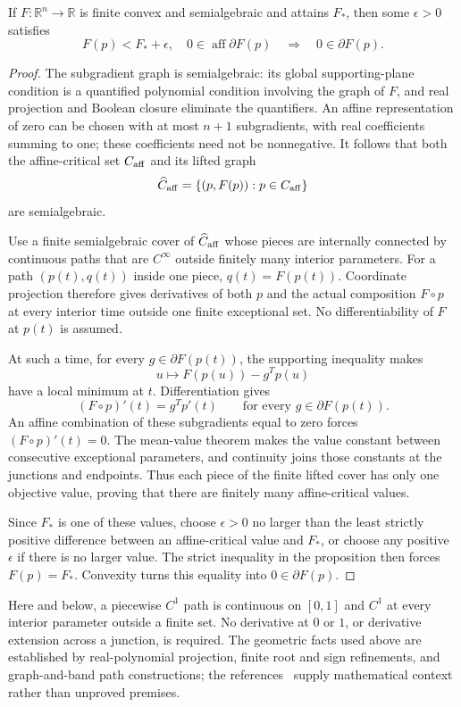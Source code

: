 \begin{proposition}\label{A:semialgebraic}
If $F:\mathbb R^n\to\mathbb R$ is finite convex and semialgebraic and attains $F_*$, then some $\epsilon>0$ satisfies
\[
 F(p)<F_*+\epsilon,\quad0\in\operatorname{aff}\partial F(p)
 \quad\Longrightarrow\quad0\in\partial F(p).
\]
\end{proposition}
\begin{proof}
The subgradient graph is semialgebraic: its global supporting-plane condition is a quantified polynomial condition involving the graph of $F$, and real projection and Boolean closure eliminate the quantifiers. An affine representation of zero can be chosen with at most $n+1$ subgradients, with real coefficients summing to one; these coefficients need not be nonnegative. It follows that both the affine-critical set $C_{\rm aff}$ and its lifted graph
\[
 \widehat C_{\rm aff}=\{(p,F(p)):p\in C_{\rm aff}\}
\]
are semialgebraic.

Use a finite semialgebraic cover of $\widehat C_{\rm aff}$ whose pieces are internally connected by continuous paths that are $C^\infty$ outside finitely many interior parameters. For a path $(p(t),q(t))$ inside one piece, $q(t)=F(p(t))$. Coordinate projection therefore gives derivatives of both $p$ and the actual composition $F\circ p$ at every interior time outside one finite exceptional set. No differentiability of $F$ at $p(t)$ is assumed.

At such a time, for every $g\in\partial F(p(t))$, the supporting inequality makes
\[
 u\longmapsto F(p(u))-g^Tp(u)
\]
have a local minimum at $t$. Differentiation gives
\[
 (F\circ p)'(t)=g^Tp'(t)\qquad\text{for every }g\in\partial F(p(t)).
\]
An affine combination of these subgradients equal to zero forces $(F\circ p)'(t)=0$. The mean-value theorem makes the value constant between consecutive exceptional parameters, and continuity joins those constants at the junctions and endpoints. Thus each piece of the finite lifted cover has only one objective value, proving that there are finitely many affine-critical values.

Since $F_*$ is one of these values, choose $\epsilon>0$ no larger than the least strictly positive difference between an affine-critical value and $F_*$, or choose any positive $\epsilon$ if there is no larger value. The strict inequality in the proposition then forces $F(p)=F_*$. Convexity turns this equality into $0\in\partial F(p)$.
\end{proof}
Here and below, a piecewise $C^1$ path is continuous on $[0,1]$ and $C^1$ at every interior parameter outside a finite set. No derivative at $0$ or $1$, or derivative extension across a junction, is required. The geometric facts used above are established by real-polynomial projection, finite root and sign refinements, and graph-and-band path constructions; the references~\cite{BDLS} supply mathematical context rather than unproved premises.

